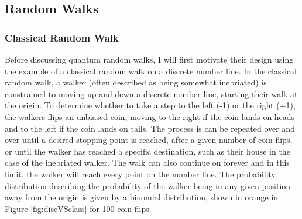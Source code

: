 \subsection{Random Walks}
\subsubsection{Classical Random Walk}
Before discussing quantum random walks, I will first motivate their design using the example of a classical random walk on a discrete number line.
In the classical random walk, a walker (often described as being somewhat inebriated) is constrained to moving up and down a discrete number line, starting their walk at the origin.
To determine whether to take a step to the left (-1) or the right (+1), the walkers flips an unbiased coin, moving to the right if the coin lands on heads and to the left if the coin lands on tails. 
The process is can be repeated over and over until a desired stopping point is reached, after a given number of coin flips, or until the walker has reached a specific destination, such as their house in the case of the inebriated walker.
The walk can also continue on forever and in this limit, the walker will reach every point on the number line.
The probability distribution describing the probability of the walker being in any given position away from the origin is given by a binomial distribution, shown in orange in Figure \ref{fig:discVSclass} for 100 coin flips. 

